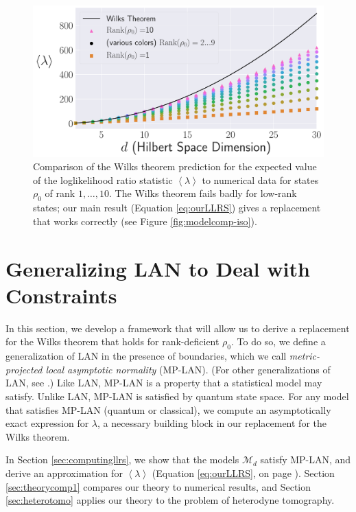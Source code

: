 \documentclass[aps,pra, twocolumn]{revtex4-1}
\newcommand{\M}{\mathcal{M}}
\newcommand{\expect}[1]{\ensuremath{\left\langle#1\right\rangle}}
\begin{document}
\begin{figure}
\includegraphics[width=\columnwidth]{Images/Figure_2.pdf}
 \caption{Comparison of the Wilks theorem prediction for the expected value of the loglikelihood ratio statistic $\expect{\lambda}$ to numerical data for states $\rho_{0}$ of rank $1,\ldots ,10$.  The Wilks theorem fails badly for low-rank states; our main result (Equation \ref{eq:ourLLRS}) gives a replacement that works correctly (see Figure \ref{fig:modelcomp-iso}).}
\label{fig:boundaries2}
\end{figure}




\section{Generalizing LAN to Deal with Constraints}
\label{sec:lanreplacement}

In this section, we develop a framework that will allow us to derive a replacement for the Wilks theorem that holds for rank-deficient $\rho_{0}$. To do so, we define a generalization of LAN in the presence of boundaries, which we call \emph{metric-projected local asymptotic normality} (MP-LAN). (For other generalizations of LAN, see \cite{Roussas2010, Jeganathan1982}.) Like LAN, MP-LAN is a property that a statistical model may satisfy. Unlike LAN, MP-LAN is satisfied by quantum state space. For any model that satisfies MP-LAN (quantum or classical), we compute an asymptotically exact expression for $\lambda$, a necessary building block in our replacement for the Wilks theorem. 

In Section \ref{sec:computingllrs}, we show that the models $\M_{d}$ satisfy MP-LAN, and derive an approximation for $\expect{\lambda}$  (Equation \eqref{eq:ourLLRS}, on  page \pageref{eq:ourLLRS}).  Section \ref{sec:theorycomp1} compares our theory to numerical results, and Section \ref{sec:heterotomo} applies our theory to the problem of heterodyne tomography.
\end{document}
